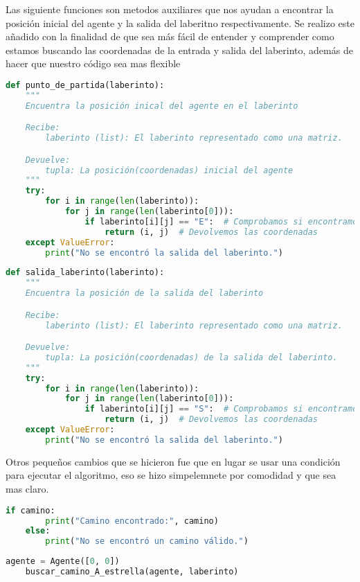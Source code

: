 Las siguiente funciones son metodos auxiliares que nos ayudan a encontrar la posición inicial del agente y la salida del laberitno respectivamente.
Se realizo este añadido con la finalidad de que sea más fácil de entender y comprender como estamos buscando las coordenadas de la entrada y salida del laberinto, además de hacer que nuestro código sea mas flexible

\begin{lstlisting}[language=Python, caption=Función auxiliar: punto_de_partida]
    def punto_de_partida(laberinto):
    """
    Encuentra la posición inical del agente en el laberinto

    Recibe:
        laberinto (list): El laberinto representado como una matriz.

    Devuelve:
        tupla: La posición(coordenadas) inicial del agente
    """
    try:
        for i in range(len(laberinto)):
            for j in range(len(laberinto[0])):
                if laberinto[i][j] == "E":  # Comprobamos si encontramos la entrada
                    return (i, j)  # Devolvemos las coordenadas 
    except ValueError:
        print("No se encontró la salida del laberinto.")
\end{lstlisting}

\begin{lstlisting}[language=Python, caption=Función auxiliar: salida_laberinto]
    def salida_laberinto(laberinto):
    """
    Encuentra la posición de la salida del laberinto

    Recibe:
        laberinto (list): El laberinto representado como una matriz.

    Devuelve:
        tupla: La posición(coordenadas) de la salida del laberinto.
    """
    try:
        for i in range(len(laberinto)):
            for j in range(len(laberinto[0])):
                if laberinto[i][j] == "S":  # Comprobamos si encontramos la salida
                    return (i, j)  # Devolvemos las coordenadas 
    except ValueError:
        print("No se encontró la salida del laberinto.")
\end{lstlisting}

Otros pequeños cambios que se hicieron fue que en lugar se usar una condición para ejecutar el algoritmo, eso se hizo simpelemnete por comodidad y que sea mas claro.

\begin{lstlisting}[language=Python, caption=Versión 1: ejecución algoritmo]
	if camino:
    	print("Camino encontrado:", camino)
	else:
    	print("No se encontró un camino válido.")
\end{lstlisting}

\begin{lstlisting}[language=Python, caption=Versión 2: ejecución algoritmo]
	agente = Agente([0, 0])
	buscar_camino_A_estrella(agente, laberinto)
\end{lstlisting}

